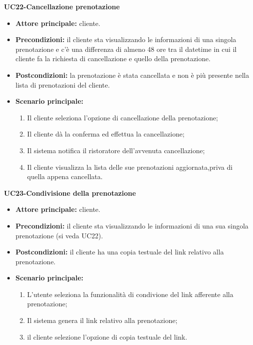 \textbf{UC22-Cancellazione prenotazione}
\begin{itemize}
    \item \textbf{Attore principale: } cliente.
    \item \textbf{Precondizioni: }il cliente sta visualizzando le informazioni di una singola prenotazione
    e c'è una differenza di almeno 48 ore tra il datetime in cui il cliente fa la richiesta di cancellazione e quello della prenotazione.
    \item \textbf{Postcondizioni: }la prenotazione è stata cancellata e non è più presente nella lista di prenotazioni
    del cliente.
    \item \textbf{Scenario principale:} 
        \begin{enumerate}
            \item Il cliente seleziona l'opzione di cancellazione della prenotazione;
            \item Il cliente dà la conferma ed effettua la cancellazione;
            \item Il sistema notifica il ristoratore dell'avvenuta cancellazione;
            \item Il cliente visualizza la lista delle sue prenotazioni aggiornata,priva di quella appena
            cancellata.
        \end{enumerate}
\end{itemize}

\textbf{UC23-Condivisione della prenotazione}
\begin{itemize}
    \item \textbf{Attore principale: } cliente.
    \item \textbf{Precondizioni: }il cliente sta visualizzando le informazioni di una sua singola prenotazione (si veda UC22).
    \item \textbf{Postcondizioni: }il cliente ha una copia testuale del link relativo alla prenotazione.
    \item \textbf{Scenario principale:} 
        \begin{enumerate}
            \item L'utente seleziona la funzionalità di condivione del link afferente alla prenotazione;
            \item Il sistema genera il link relativo alla prenotazione;
            \item il cliente selezione l'opzione di copia testuale del link.
        \end{enumerate}
\end{itemize}

